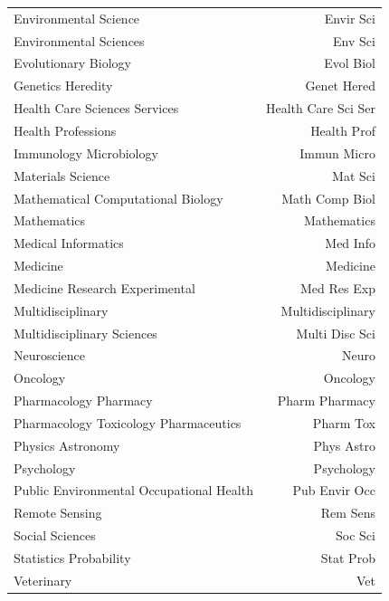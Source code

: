 \begin{table}[h]
\begin{tabular}{p{10cm} | r }
		Environmental Science &  Envir Sci \\ 
		Environmental Sciences &  Env Sci \\
		Evolutionary Biology &  Evol Biol \\
		Genetics Heredity &  Genet Hered \\
		Health Care Sciences Services &  Health Care Sci Ser \\
		Health Professions &   Health Prof \\ 
		Immunology Microbiology &   Immun Micro \\ 
		Materials Science &   Mat Sci \\ 
		Mathematical Computational Biology &  Math Comp Biol \\
		Mathematics &  Mathematics \\ 
		Medical Informatics &  Med Info \\
		Medicine &  Medicine \\ 
		Medicine Research Experimental &  Med Res Exp \\
		Multidisciplinary &   Multidisciplinary \\ 
		Multidisciplinary Sciences & Multi Disc Sci \\
		Neuroscience &   Neuro \\ 
		Oncology &  Oncology \\
		Pharmacology Pharmacy & Pharm Pharmacy \\
		Pharmacology Toxicology Pharmaceutics &   Pharm Tox \\ 
		Physics Astronomy &   Phys Astro \\ 
		Psychology &   Psychology \\ 
		Public Environmental Occupational Health & Pub Envir Occ \\
		Remote Sensing & Rem Sens \\
		Social Sciences &  Soc Sci \\ 
		Statistics Probability & Stat Prob \\
		Veterinary &  Vet \\ 
		\bottomrule
	\end{tabular}
\end{table}



